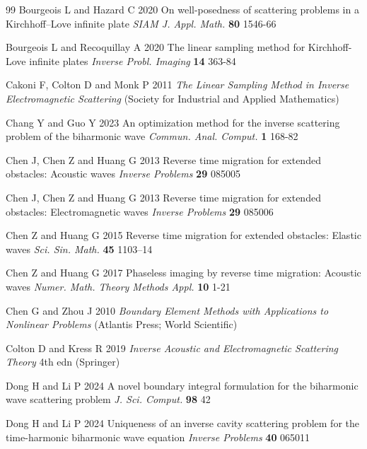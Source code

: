 \documentclass[10pt,a4paper]{article}
\numberwithin{equation}{section}
\begin{document}
\begin{thebibliography}{99}
 Bourgeois L and Hazard C 2020 On well-posedness of scattering problems in a Kirchhoff--Love infinite plate \emph{SIAM J. Appl. Math.} {\bf 80} 1546-66
  
  Bourgeois L and Recoquillay A 2020 The linear sampling method for Kirchhoff-Love infinite plates \emph{Inverse Probl. Imaging} {\bf 14} 363-84

  Cakoni F, Colton D and Monk P 2011 \emph{The Linear Sampling Method in Inverse Electromagnetic Scattering} (Society for Industrial and Applied Mathematics)

   Chang Y and Guo Y 2023 An optimization method for the inverse scattering problem of the biharmonic wave \emph{Commun. Anal. Comput.} {\bf 1} 168-82
  
  Chen J, Chen Z and Huang G 2013 Reverse time migration for extended obstacles: Acoustic waves \emph{Inverse Problems} {\bf 29} 085005
  
  Chen J, Chen Z and Huang G 2013 Reverse time migration for extended obstacles: Electromagnetic waves \emph{Inverse Problems} {\bf 29} 085006

  Chen Z and Huang G  2015 Reverse time migration for extended obstacles: Elastic waves \emph{Sci. Sin. Math.} {\bf 45} 1103–14
  
  Chen Z and Huang G 2017 Phaseless imaging by reverse time migration: Acoustic waves \emph{Numer. Math. Theory Methods Appl.} {\bf 10} 1-21

  Chen G and Zhou J 2010 \emph{Boundary Element Methods with Applications to Nonlinear Problems} (Atlantis Press; World Scientific)

  Colton D and Kress R 2019 \emph{Inverse Acoustic and Electromagnetic Scattering Theory} 4th edn (Springer)

    Dong H and Li P 2024 A novel boundary integral formulation for the biharmonic wave scattering problem \emph{J. Sci. Comput.} {\bf 98} 42


   Dong H and Li P 2024 Uniqueness of an inverse cavity scattering problem for the time-harmonic biharmonic wave equation \emph{Inverse Problems} {\bf 40} 065011
  

\end{thebibliography}
\end{document}
